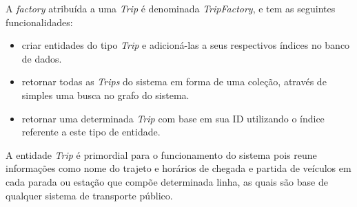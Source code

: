 A \emph{factory} atribuída a uma \emph{Trip} é denominada \emph{TripFactory}, e tem as seguintes funcionalidades:
\begin{itemize}
	\item criar entidades do tipo \emph{Trip} e adicioná-las a seus respectivos índices no banco de dados.
	\item retornar todas as \emph{Trips} do sistema em forma de uma coleção, através de simples uma busca no grafo do sistema.
	\item retornar uma determinada \emph{Trip} com base em sua ID utilizando o índice referente a este tipo de entidade.
\end{itemize}

A entidade \emph{Trip} é primordial para o funcionamento do sistema pois reune informações como nome do trajeto e horários de chegada e partida de veículos em cada parada ou estação que compõe determinada linha, as quais são base de qualquer sistema de transporte público.


